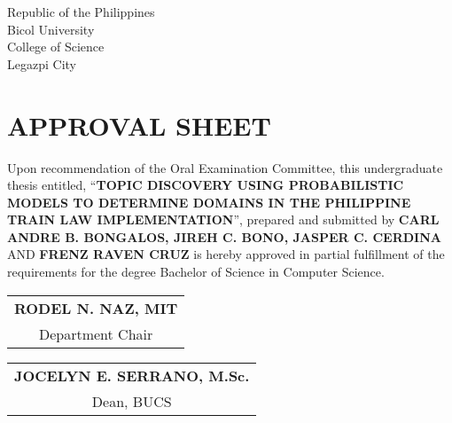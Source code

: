
%

\begin{center}
	{   Republic of the Philippines \\
		Bicol University \\
		College of Science \\
		Legazpi City \\[0.1ex]}
\end{center} 
		
\section{\normalsize{APPROVAL SHEET}}
	
Upon recommendation of the Oral Examination Committee, this undergraduate thesis entitled, “\textbf{TOPIC DISCOVERY USING PROBABILISTIC MODELS TO DETERMINE DOMAINS IN THE PHILIPPINE TRAIN LAW IMPLEMENTATION}”, prepared and submitted by \textbf{CARL ANDRE B. BONGALOS, JIREH C. BONO, JASPER C. CERDINA} AND \textbf{FRENZ RAVEN CRUZ} is hereby approved in partial fulfillment of the requirements for the degree Bachelor of Science in Computer Science. \\[100pt]
		
\begin{flushright}
    \begin{tabular}{c}
    	\textbf{RODEL N. NAZ, MIT \hspace*{1cm}}\\
        {Department Chair \hspace*{1cm}}
    \end{tabular}
\end{flushright}
\vspace{3ex}

\begin{flushright}
    \begin{tabular}{c}
    	\textbf{JOCELYN E. SERRANO, M.Sc.}\\
        Dean, BUCS
    \end{tabular}
\end{flushright}
\vfill


		 
		
    

%